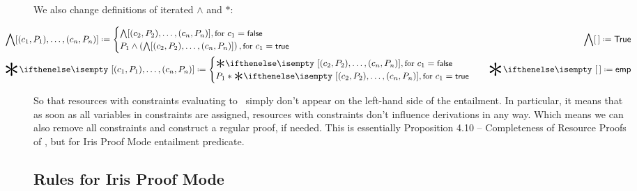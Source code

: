 We also change definitions of iterated \(\wedge\) and \(*\):\\
\begin{minipage}[t]{1.1\linewidth}
  \begin{align*}
    & \hspace{-0.1\linewidth}
      \bigwedge  [(c_1, P_1), \dots, (c_n, P_n)] \defeq
      \begin{cases}
        \bigwedge [(c_2, P_2), \dots, (c_n, P_n)],
          {\small \text{for } c_1 = \false}\\
        P_1 \wedge \left( \bigwedge [(c_2, P_2), \dots, (c_n, P_n)] \right),
          {\small \text{for } c_1 = \true }
      \end{cases}
    & \bigwedge [\,] \defeq \True \\
    & \hspace{-0.1\linewidth}
      \Sep {[(c_1, P_1), \dots, (c_n, P_n)]} \defeq
      \begin{cases}
        \Sep {[(c_2, P_2), \dots, (c_n, P_n)]},
          {\small \text{for } c_1 = \false} \\
        P_1 * \Sep {[(c_2, P_2), \dots, (c_n, P_n)]},
          {\small \text{for } c_1 = \true}
      \end{cases}
    & \Sep {[\,]} \defeq \emp
  \end{align*}
\end{minipage}

So that resources with constraints evaluating to \false~simply don't appear on the left-hand side of the entailment.
In particular, it means that as soon as all variables in constraints are assigned, resources with \false constraints don't influence derivations in any way.
Which means we can also remove all constraints and construct a regular proof, if needed.
This is essentially Proposition 4.10 -- Completeness of Resource Proofs of \citet[page~25]{harlandResourceDistributionBooleanConstraints2003}, but for Iris Proof Mode entailment predicate.

\subsection{Rules for Iris Proof Mode}


